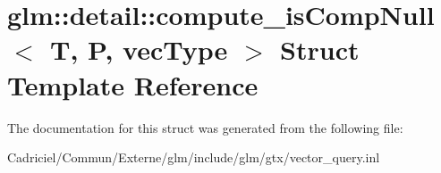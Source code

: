 \hypertarget{structglm_1_1detail_1_1compute__is_comp_null}{}\section{glm\+:\+:detail\+:\+:compute\+\_\+is\+Comp\+Null$<$ T, P, vec\+Type $>$ Struct Template Reference}
\label{structglm_1_1detail_1_1compute__is_comp_null}


The documentation for this struct was generated from the following file\+:\begin{DoxyCompactItemize}
\item 
Cadriciel/\+Commun/\+Externe/glm/include/glm/gtx/vector\+\_\+query.\+inl\end{DoxyCompactItemize}
